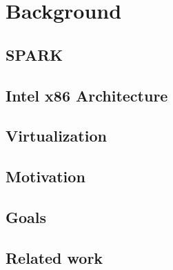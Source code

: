 \chapter{Background}
\section{SPARK}
\section{Intel x86 Architecture}
\section{Virtualization}
\section{Motivation}
\section{Goals}
\section{Related work}
